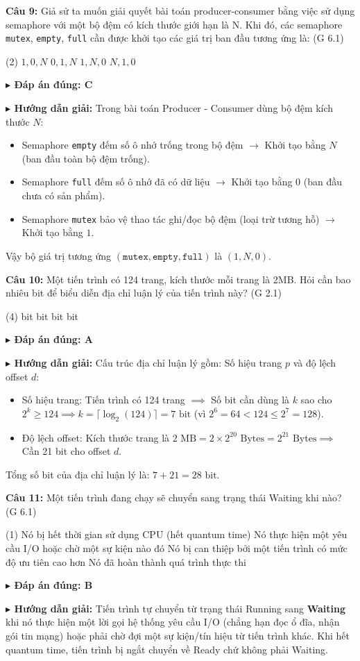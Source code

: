 \documentclass[11pt,a4paper]{article}
\newcommand{\giaithich}[2]{%
    \par\vspace{0.15cm}\noindent
    \begingroup\small
    \noindent\textbf{\color{blue}$\blacktriangleright$ Đáp án đúng: #1} \par\vspace{0.08cm}
    \noindent\textbf{\color{teal}$\blacktriangleright$ Hướng dẫn giải:} #2
    \endgroup\par\vspace{0.35cm}
}
\begin{document}
\noindent\textbf{Câu 9:} Giả sử ta muốn giải quyết bài toán producer-consumer bằng việc sử dụng semaphore với một bộ đệm có kích thước giới hạn là N. Khi đó, các semaphore \texttt{mutex}, \texttt{empty}, \texttt{full} cần được khởi tạo các giá trị ban đầu tương ứng là: (G 6.1)
\begin{tasks}(2)
    \task $1, 0, N$
    \task $0, 1, N$
    \task $1, N, 0$
    \task $N, 1, 0$
\end{tasks}
\giaithich{C}{Trong bài toán Producer - Consumer dùng bộ đệm kích thước $N$:
\begin{itemize}[noitemsep,topsep=1pt]
    \item Semaphore \texttt{empty} đếm số ô nhớ trống trong bộ đệm $\rightarrow$ Khởi tạo bằng $N$ (ban đầu toàn bộ đệm trống).
    \item Semaphore \texttt{full} đếm số ô nhớ đã có dữ liệu $\rightarrow$ Khởi tạo bằng $0$ (ban đầu chưa có sản phẩm).
    \item Semaphore \texttt{mutex} bảo vệ thao tác ghi/đọc bộ đệm (loại trừ tương hỗ) $\rightarrow$ Khởi tạo bằng $1$.
\end{itemize}
Vậy bộ giá trị tương ứng $(\texttt{mutex}, \texttt{empty}, \texttt{full})$ là $(1, N, 0)$.}

\noindent\textbf{Câu 10:} Một tiến trình có 124 trang, kích thước mỗi trang là 2MB. Hỏi cần bao nhiêu bit để biểu diễn địa chỉ luận lý của tiến trình này? (G 2.1)
\begin{tasks}(4)
     bit
     bit
     bit
     bit
\end{tasks}
\giaithich{A}{Cấu trúc địa chỉ luận lý gồm: Số hiệu trang $p$ và độ lệch offset $d$:
\begin{itemize}[noitemsep,topsep=1pt]
    \item Số hiệu trang: Tiến trình có 124 trang $\implies$ Số bit cần dùng là $k$ sao cho $2^k \ge 124 \implies k = \lceil \log_2(124) \rceil = 7\text{ bit}$ (vì $2^6 = 64 < 124 \le 2^7 = 128$).
    \item Độ lệch offset: Kích thước trang là $2\text{ MB} = 2 \times 2^{20}\text{ Bytes} = 2^{21}\text{ Bytes} \implies$ Cần 21 bit cho offset $d$.
\end{itemize}
Tổng số bit của địa chỉ luận lý là: $7 + 21 = 28\text{ bit}$.}

\noindent\textbf{Câu 11:} Một tiến trình đang chạy sẽ chuyển sang trạng thái Waiting khi nào? (G 6.1)
\begin{tasks}(1)
    \task Nó bị hết thời gian sử dụng CPU (hết quantum time)
    \task Nó thực hiện một yêu cầu I/O hoặc chờ một sự kiện nào đó
    \task Nó bị can thiệp bởi một tiến trình có mức độ ưu tiên cao hơn
    \task Nó đã hoàn thành quá trình thực thi
\end{tasks}
\giaithich{B}{Tiến trình tự chuyển từ trạng thái Running sang \textbf{Waiting} khi nó thực hiện một lời gọi hệ thống yêu cầu I/O (chẳng hạn đọc ổ đĩa, nhận gói tin mạng) hoặc phải chờ đợi một sự kiện/tín hiệu từ tiến trình khác. Khi hết quantum time, tiến trình bị ngắt chuyển về Ready chứ không phải Waiting.}
\end{document}
